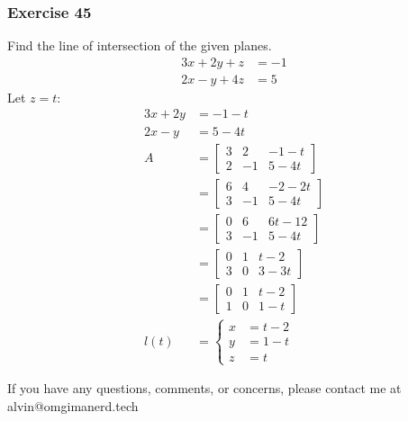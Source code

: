 \documentclass[letterpaper, 12pt]{math}
\begin{document}
\subsubsection*{Exercise 45}
Find the line of intersection of the given planes.
\begin{align*}
  3x+2y+z &= -1 \\
  2x-y+4z &= 5
\end{align*}
Let \( z = t \):
\begin{align*}
  3x+2y &= -1-t \\
  2x-y &= 5-4t \\
  A &= \begin{bmatrix}
    3 & 2 & -1-t \\
    2 & -1 & 5-4t
  \end{bmatrix} \\
  &= \begin{bmatrix}
    6 & 4 & -2-2t \\
    3 & -1 & 5-4t
  \end{bmatrix} \\
  &= \begin{bmatrix}
    0 & 6 & 6t-12 \\
    3 & -1 & 5-4t
  \end{bmatrix} \\
  &= \begin{bmatrix}
    0 & 1 & t-2 \\
    3 & 0 & 3-3t
  \end{bmatrix} \\
  &= \begin{bmatrix}
    0 & 1 & t-2 \\
    1 & 0 & 1-t
  \end{bmatrix} \\
  l(t) &= \begin{cases}
    x &= t-2 \\
    y &= 1-t \\
    z &= t
  \end{cases}
\end{align*}

\begin{center}
  If you have any questions, comments, or concerns, please contact me at
  alvin@omgimanerd.tech
\end{center}
\end{document}
